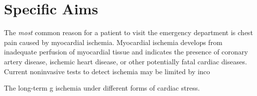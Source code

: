 %


%

\section{Specific Aims}

The \textit{most} common reason for a patient to visit the emergency
department is chest pain caused by myocardial ischemia. Myocardial ischemia
develops from inadequate perfusion of myocardial tissue and indicates the
presence of coronary artery disease, ischemic heart disease, or other
potentially fatal cardiac diseases. Current noninvasive tests to detect
ischemia may be limited by inco

The long-term g
      ischemia under different forms of cardiac stress.
	
